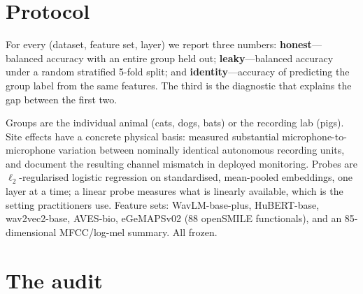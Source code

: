 \documentclass{article}
\begin{document}
\section{Protocol}

For every (dataset, feature set, layer) we report three numbers: \textbf{honest}---balanced accuracy
with an entire group held out; \textbf{leaky}---balanced accuracy under a random stratified 5-fold
split; and \textbf{identity}---accuracy of predicting the group label from the same features. The
third is the diagnostic that explains the gap between the first two.

Groups are the individual animal (cats, dogs, bats) or the recording lab (pigs). Site effects have a
concrete physical basis: \citet{turgeon2017} measured substantial microphone-to-microphone variation
between nominally identical autonomous recording units, and \citet{lostanlen2019} document the
resulting channel mismatch in deployed monitoring. Probes are
$\ell_2$-regularised logistic regression on standardised, mean-pooled embeddings, one layer at a
time; a linear probe measures what is linearly available, which is the setting practitioners use.
Feature sets: WavLM-base-plus, HuBERT-base, wav2vec2-base, AVES-bio, eGeMAPSv02 (88 openSMILE
functionals), and an 85-dimensional MFCC/log-mel summary. All frozen.

\section{The audit}\label{sec:audit}
\end{document}
